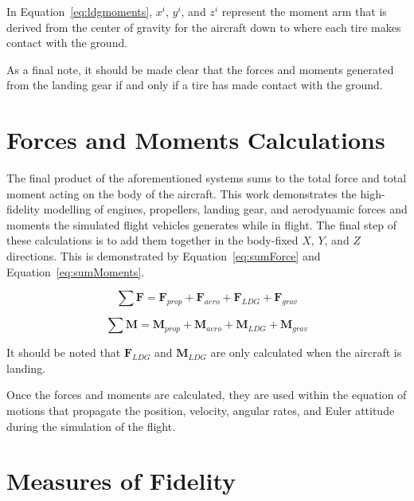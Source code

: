 In Equation~\ref{eq:ldgmoments}, \(x^i\), \(y^i\), and \(z^i\) represent the moment arm that is derived from the center of gravity for the aircraft down to where each tire makes contact with the ground.

As a final note, it should be made clear that the forces and moments generated from the landing gear if and only if a tire has made contact with the ground.

\section{\textbf{Forces and Moments Calculations}}
The final product of the aforementioned systems sums to the total force and total moment acting on the body of the aircraft. This work demonstrates the high-fidelity modelling of engines, propellers, landing gear, and aerodynamic forces and moments the simulated flight vehicles generates while in flight. The final step of these calculations is to add them together in the body-fixed \(X\), \(Y\), and \(Z\) directions. This is demonstrated by Equation~\ref{eq:sumForce} and Equation~\ref{eq:sumMoments}.

\begin{equation}
    \sum \mathbf{F} = \mathbf{F}_{prop} + \mathbf{F}_{aero} + \mathbf{F}_{LDG} + \mathbf{F}_{grav}
    \label{eq:sumForce}
\end{equation}

\begin{equation}
    \sum \mathbf{M} = \mathbf{M}_{prop} + \mathbf{M}_{aero} + \mathbf{M}_{LDG} + \mathbf{M}_{grav}
    \label{eq:sumMoments}
\end{equation}

It should be noted that \(\mathbf{F}_{LDG}\) and \(\mathbf{M}_{LDG}\) are only calculated when the aircraft is landing.

Once the forces and moments are calculated, they are used within the equation of motions that propagate the position, velocity, angular rates, and Euler attitude during the simulation of the flight.

\section{\textbf{Measures of Fidelity}}

